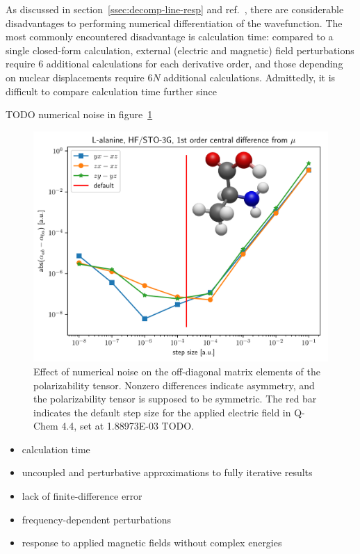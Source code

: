 \documentclass[%
class = book,%
crop = false,%
float = true,%
multi = true,%
preview = false,%
]{standalone}
\begin{document}
As discussed in section~\ref{ssec:decomp-line-resp} and ref.~\parencite{gauss2000}, there are considerable disadvantages to performing numerical differentiation of the wavefunction. The most commonly encountered disadvantage is calculation time: compared to a single closed-form calculation, external (electric and magnetic) field perturbations require 6 additional calculations for each derivative order, and those depending on nuclear displacements require \(6N\) additional calculations. Admittedly, it is difficult to compare calculation time further since

TODO numerical noise in figure~\ref{fig:finite-difference-numerical-noise}

\begin{figure}
  \centering
  \includegraphics[width=\textwidth]{./diff_overlay.pdf}
  \caption[Asymmetry in the 1st-order finite-difference polarizability]{Effect of numerical noise on the off-diagonal matrix elements of the polarizability tensor. Nonzero differences indicate asymmetry, and the polarizability tensor is supposed to be symmetric. The red bar indicates the default step size for the applied electric field in Q-Chem 4.4, set at \SI{1.88973E-03}{\au} TODO.}
  \label{fig:finite-difference-numerical-noise}
\end{figure}

\begin{itemize}
\item calculation time
\item uncoupled and perturbative approximations to fully iterative results
\item lack of finite-difference error
\item frequency-dependent perturbations
\item response to applied magnetic fields without complex energies
\end{itemize}
\end{document}
